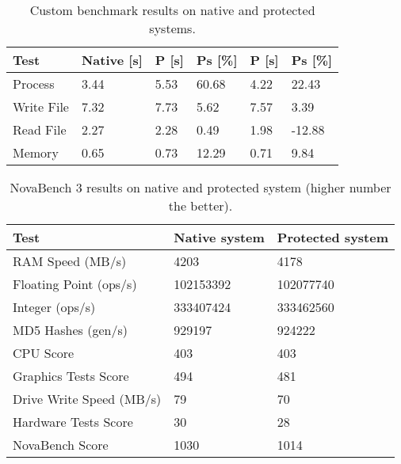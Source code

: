 \documentclass[10pt,twocolumn,a4paper]{article}
\begin{document}
\begin{table}[!h]
  \centering
  \caption{Custom benchmark results on native and protected systems.}
    \begin{tabular}{|p{1.6cm}|p{0.9cm}|p{0.6cm}|p{0.7cm}|p{0.6cm}|p{1cm}|}
    \addlinespace
    \toprule
    Test  & Native [s] & P [s] & Ps [\%] & P [s] & Ps [\%] \\
    \midrule
    Process & 3.44  & 5.53  & 60.68 & 4.22  & 22.43 \\
    \hline
    Write File & 7.32  & 7.73  & 5.62  & 7.57  & 3.39 \\
    \hline
    Read File & 2.27  & 2.28  & 0.49  & 1.98  & -12.88 \\
    \hline
    Memory & 0.65  & 0.73  & 12.29 & 0.71  & 9.84 \\
    \bottomrule
    \end{tabular}\label{tab:nasz_benchmark}\end{table}




\begin{table}[htbp]
  \centering
  \caption{NovaBench 3 results on native and protected system (higher number the better).}
    \begin{tabular}{|p{3.5cm}|p{1.5cm}|p{1.6cm}|}
    \addlinespace
    \toprule
    Test  &  Native system & Protected system \\
    \midrule
    RAM Speed (MB/s) & 4203  & 4178 \\
    \hline
    Floating Point (ops/s) & 102153392 & 102077740 \\
    \hline
    Integer (ops/s) & 333407424 & 333462560 \\
    \hline
    MD5 Hashes (gen/s) & 929197 & 924222 \\
    \hline
    CPU Score & 403   & 403 \\
    \hline
    Graphics Tests Score & 494   & 481 \\
    \hline
    Drive Write Speed (MB/s) & 79    & 70 \\
    \hline
    Hardware Tests Score & 30    & 28 \\
    \hline
    NovaBench Score & 1030  & 1014 \\
    \bottomrule
    \end{tabular}\label{tab:novabench}\end{table}
\end{document}
